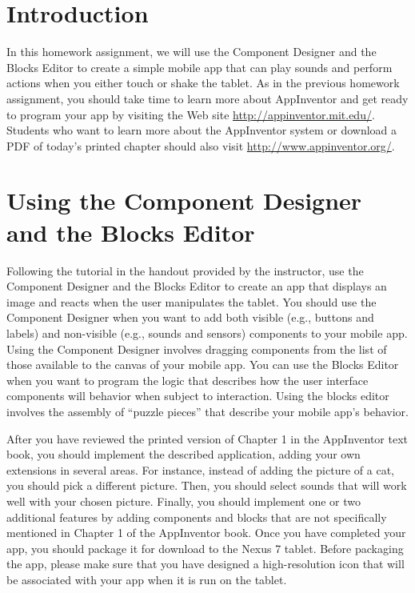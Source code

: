 	

\usepackage[compact]{titlesec}



\vspace*{-.1in}
\section*{Introduction}

In this homework assignment, we will use the Component Designer and the Blocks Editor to create a simple mobile app that
can play sounds and perform actions when you either touch or shake the tablet.  As in the previous homework assignment,
you should take time to learn more about AppInventor and get ready to program your app by visiting the Web site
\url{http://appinventor.mit.edu/}. Students who want to learn more about the AppInventor system or download a PDF of
today's printed chapter should also visit \url{http://www.appinventor.org/}.

\section*{Using the Component Designer and the Blocks Editor}

Following the tutorial in the handout provided by the instructor, use the Component Designer and the Blocks Editor
to create an app that displays an image and reacts when the user manipulates the tablet.  You should use the Component
Designer when you want to add both visible (e.g., buttons and labels) and non-visible (e.g., sounds and sensors)
components to your mobile app.  Using the Component Designer involves dragging components from the list of those
available to the canvas of your mobile app.  You can use the Blocks Editor when you want to program the logic that
describes how the user interface components will behavior when subject to interaction. Using the blocks editor involves
the assembly of ``puzzle pieces'' that describe your mobile app's behavior.

After you have reviewed the printed version of Chapter 1 in the AppInventor text book, you should implement the
described application, adding your own extensions in several areas.  For instance, instead of adding the picture of a
cat, you should pick a different picture.  Then, you should select sounds that will work well with your chosen picture.
Finally, you should implement one or two additional features by adding components and blocks that are not specifically
mentioned in Chapter 1 of the AppInventor book. Once you have completed your app, you should package it for download to
the Nexus 7 tablet.  Before packaging the app, please make sure that you have designed a high-resolution icon that will
be associated with your app when it is run on the tablet.

